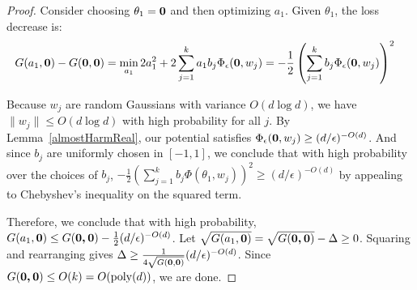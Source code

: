 \almostharminitialize*

 \begin{proof}
  Consider choosing $\theta_1 = {\bf 0}$ and then
  optimizing $a_1$. Given $\theta_1$, the loss decrease is:
%
\begin{align*}
   G(a_1,{\bf 0}) - G({\bf 0},{\bf 0}) & = \min_{a_1} 2a_1^2 +
  2\sum_{j=1}^k a_1 b_j\Phi_\epsilon({\bf 0},w_j) 
 = -\frac{1}{2}\left(  \sum_{j=1}^k b_j
   \Phi_\epsilon({\bf 0},w_j)\right)^2 
\end{align*}

Because $w_j$ are random Gaussians with variance $O(d \log d)$, we have $\|w_j\| \leq O(d\log d)$ with high probability for all $j$. By Lemma~\ref{almostHarmReal}, our potential satisfies ${\Phi}_\epsilon({\bf 0}, w_j) \geq (d/\epsilon)^{ - O(d)}$. And since $b_j$ are uniformly chosen in $[-1,1]$, we conclude that with high probability over the choices of $b_j$, $-\frac{1}{2}\left( \sum_{j=1}^k b_j\Phi(\theta_1,w_j)\right)^2 \geq (d/\epsilon)^{ - O(d)}$ by appealing to Chebyshev's inequality on the squared term. 


Therefore, we conclude that with high probability, $G(a_1, {\bf 0}) \leq G(\boldsymbol{0,0}) - \frac{1}{2}(d/\epsilon)^{ - O(d)}$. Let $\sqrt{G(a_1, {\bf 0})} = \sqrt{G(\boldsymbol{0,0})} - \Delta \geq 0$. Squaring and rearranging gives $\Delta \geq \frac{1}{4\sqrt{G({\bf 0, 0})}}(d/\epsilon)^{ - O(d)}$. Since $G(\boldsymbol{0,0}) \leq O(k) = O(\mathrm{poly}(d))$, we are done. 
\end{proof}
%
%



